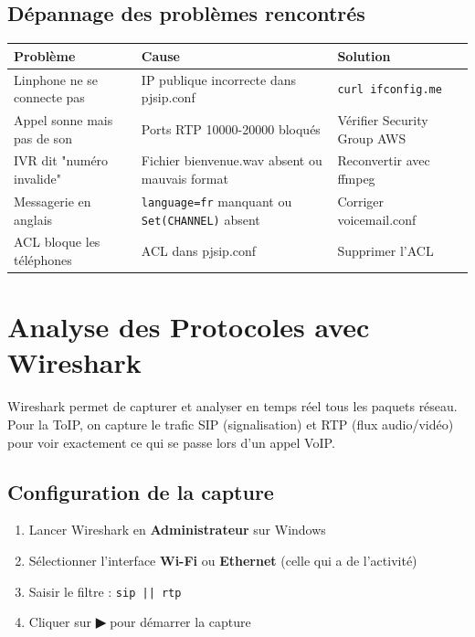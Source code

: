 \documentclass[a4paper,11pt]{report}
\begin{document}
\section{Dépannage des problèmes rencontrés}

\begin{center}
\begin{tabularx}{\textwidth}{lXl}
\toprule
\rowcolor{primarylight}\textbf{Problème} & \textbf{Cause} & \textbf{Solution}\\
\midrule
Linphone ne se connecte pas & IP publique incorrecte dans pjsip.conf & \texttt{curl ifconfig.me}\\
Appel sonne mais pas de son & Ports RTP 10000-20000 bloqués & Vérifier Security Group AWS\\
IVR dit "numéro invalide" & Fichier bienvenue.wav absent ou mauvais format & Reconvertir avec ffmpeg\\
Messagerie en anglais & \texttt{language=fr} manquant ou \texttt{Set(CHANNEL)} absent & Corriger voicemail.conf\\
ACL bloque les téléphones & ACL dans pjsip.conf & Supprimer l'ACL\\
\bottomrule
\end{tabularx}
\end{center}

\chapter{Analyse des Protocoles avec Wireshark}

\begin{infobox}
Wireshark permet de capturer et analyser en temps réel tous les paquets réseau. Pour la ToIP, on capture le trafic SIP (signalisation) et RTP (flux audio/vidéo) pour voir exactement ce qui se passe lors d'un appel VoIP.
\end{infobox}

\section{Configuration de la capture}

\begin{enumerate}[leftmargin=1.4em, itemsep=4pt]
  \item Lancer Wireshark en \textbf{Administrateur} sur Windows
  \item Sélectionner l'interface \textbf{Wi-Fi} ou \textbf{Ethernet} (celle qui a de l'activité)
  \item Saisir le filtre : \texttt{sip || rtp}
  \item Cliquer sur \textbf{▶} pour démarrer la capture
\end{enumerate}
\end{document}
